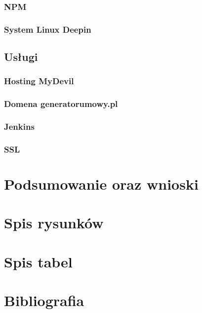\documentclass[12pt]{article}
\begin{document}
            \subsubsection{NPM}
            \subsubsection{System Linux Deepin}
        \subsection{Usługi}
            \subsubsection{Hosting MyDevil}
            \subsubsection{Domena generatorumowy.pl}
            \subsubsection{Jenkins}
            \subsubsection{SSL}
    \section{Podsumowanie oraz wnioski}
    \section{Spis rysunków}
    \section{Spis tabel}
    \section{Bibliografia}
\end{document}

